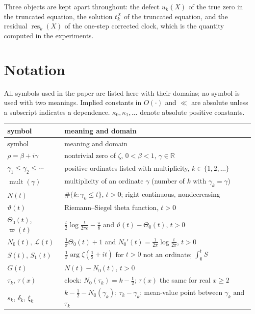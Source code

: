 \documentclass[11pt,reqno]{amsart}
\numberwithin{equation}{section}
\theoremstyle{plain}
\theoremstyle{definition}
\theoremstyle{remark}
\newcommand{\R}{\mathbb R}
\newcommand{\NO}{N_0}
\newcommand{\lL}{\mathcal L}
\newcommand{\mult}{\operatorname{mult}}
\newcommand{\res}{\operatorname{res}}
\begin{document}
Three objects are kept apart throughout: the defect $u_k(X)$ of the true zero in the truncated equation, the solution $t_k^X$ of the truncated equation, and the residual $\res_k(X)$ of the one-step corrected clock, which is the quantity computed in the experiments.

\section{Notation}
\label{sec:notation}

All symbols used in the paper are listed here with their domains; no symbol is used with two meanings. Implied constants in $O(\cdot)$ and $\ll$ are absolute unless a subscript indicates a dependence. $\kappa_0,\kappa_1,\dots$ denote absolute positive constants.

\begin{center}
\small
\begin{longtable}{p{}p{}}
\toprule
symbol & meaning and domain\\
\midrule
\endfirsthead
\toprule
symbol & meaning and domain\\
\midrule
\endhead
$\rho=\beta+i\gamma$ & nontrivial zero of $\zeta$, $0<\beta<1$, $\gamma\in\R$\\
$\gamma_1\le\gamma_2\le\cdots$ & positive ordinates listed with multiplicity, $k\in\{1,2,\dots\}$\\
$\mult(\gamma)$ & multiplicity of an ordinate $\gamma$ (number of $k$ with $\gamma_k=\gamma$)\\
$N(t)$ & $\#\{k:\gamma_k\le t\}$, $t>0$; right continuous, nondecreasing\\
$\vartheta(t)$ & Riemann--Siegel theta function, $t>0$\\
$\Theta_0(t)$, $\varpi(t)$ & $\frac t2\log\frac t{2\pi e}-\frac\pi8$ and $\vartheta(t)-\Theta_0(t)$, $t>0$\\
$\NO(t)$, $\lL(t)$ & $\frac1\pi\Theta_0(t)+1$ and $\NO'(t)=\frac1{2\pi}\log\frac t{2\pi}$, $t>0$\\
$S(t)$, $S_1(t)$ & $\frac1\pi\arg\zeta(\frac12+it)$ for $t>0$ not an ordinate; $\int_0^tS$\\
$G(t)$ & $N(t)-\NO(t)$, $t>0$\\
$\tau_k$, $\tau(x)$ & clock: $\NO(\tau_k)=k-\frac12$; $\tau(x)$ the same for real $x\ge2$\\
$s_k$, $\delta_k$, $\xi_k$ & $k-\frac12-\NO(\gamma_k)$; $\tau_k-\gamma_k$; mean-value point between $\gamma_k$ and $\tau_k$\\

\end{longtable}
\end{center}
\end{document}
